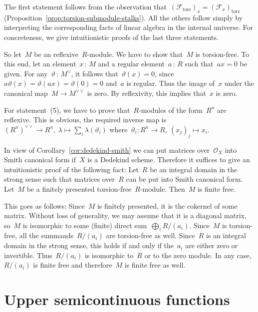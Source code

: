 \documentclass[10pt,reqno,a4paper]{amsbook}
\makeatletter
\theoremstyle{definition}
\theoremstyle{plain}
\theoremstyle{remark}
\newcommand{\F}{\mathcal{F}}
\renewcommand{\O}{\mathcal{O}}
\newcommand{\tors}{\mathrm{tors}}
\newcommand{\?}{\,{:}\,}
\renewcommand{\_}{\mathpunct{.}\,}
\renewenvironment{proof}[1][\proofname]{\par
  \pushQED{\qed}%
  \normalfont \topsep6\p@\@plus6\p@\relax
  \trivlist
  \item[\hskip\labelsep
        \itshape
    #1\@addpunct{.}]\ignorespaces
}{%
  \popQED\endtrivlist\@endpefalse
}
\makeatother
\begin{document}
\begin{proof}The first statement follows from the observation that~$(\F_\tors)_x
= (\F_x)_\tors$ (Proposition~\ref{prop:torsion-submodule-stalks}). All the
others follow simply by interpreting the corresponding facts of linear algebra
in the internal universe. For concreteness, we give intuitionistic proofs of
the last three statements.

So let~$M$ be an reflexive~$R$-module. We have to show that~$M$ is
torsion-free. To this end, let an element~$x \? M$ and a regular element~$a \?
R$ such that~$ax = 0$ be given. For any~$\vartheta \? M^\vee$, it follows
that~$\vartheta(x) = 0$, since~$a \vartheta(x) = \vartheta(ax) = \vartheta(0) =
0$ and~$a$ is regular. Thus the image of~$x$ under the canonical map~$M \to
M^{\vee\vee}$ is zero. By reflexivity, this implies that~$x$ is zero.

For statement~(5), we have to prove that~$R$-modules of the form~$R^n$ are
reflexive. This is obvious, the required inverse map is~$(R^n)^{\vee\vee} \to
R^n,\ \lambda \mapsto \sum_i \lambda(\vartheta_i)$ where~$\vartheta_i : R^n \to
R,\ (x_j)_j \mapsto x_i$.

In view of Corollary~\ref{cor:dedekind-smith} we can put matrices over~$\O_X$
into Smith canonical form if~$X$ is a Dedekind scheme. Therefore it suffices
to give an intuitionistic proof of the following fact: Let~$R$ be an integral
domain in the strong sense such that matrices over~$R$ can be put into
Smith canonical form. Let~$M$ be a finitely presented torsion-free~$R$-module.
Then~$M$ is finite free.

This goes as follows: Since~$M$ is finitely presented, it is the cokernel of
some matrix. Without loss of generality, we may assume that it is a diagonal
matrix, so~$M$ is isomorphic to some (finite) direct sum~$\bigoplus_i R/(a_i)$.
Since~$M$ is torsion-free, all the summands~$R/(a_i)$ are torsion-free as well.
Since~$R$ is an integral domain in the strong sense, this holds if and only if
the~$a_i$ are either zero or invertible. Thus~$R/(a_i)$ is isomorphic to~$R$ or
to the zero module. In any case,~$R/(a_i)$ is finite free and therefore~$M$
is finite free as well.
\end{proof}


\section{Upper semicontinuous functions}
\label{sect:upper-semicontinuous-functions}
\end{document}
